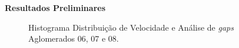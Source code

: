 \documentclass[xcolor=dvipsnames,10pt]{beamer}
\begin{document}
\begin{frame}{\textbf{Resultados Preliminares}}
\begin{figure}[!htbp]
    \caption{Histograma Distribuição de Velocidade e Análise de \textit{gaps} Aglomerados 06, 07 e 08.}
  \end{figure}
\end{frame}
\end{document}
